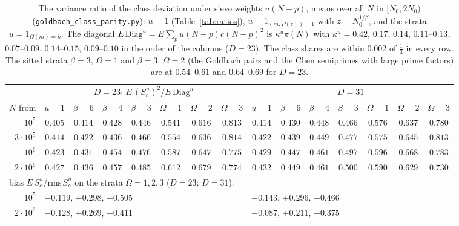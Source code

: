 \documentclass[11pt]{amsart}
\theoremstyle{remark}
\begin{document}
\begin{table}[htbp]
\centering\footnotesize\setlength{\tabcolsep}{3.2pt}
\begin{tabular}{r|ccccccc|ccccccc}
\toprule
& \multicolumn{7}{c|}{$D=23$: $E\,(S^u_c)^2/E\,\mathrm{Diag}^u$} & \multicolumn{7}{c}{$D=31$}\\
$N$ from & $u=1$ & $\beta=6$ & $\beta=4$ & $\beta=3$ & $\Omega=1$ & $\Omega=2$ & $\Omega=3$ & $u=1$ & $\beta=6$ & $\beta=4$ & $\beta=3$ & $\Omega=1$ & $\Omega=2$ & $\Omega=3$\\
\midrule
$10^5$ & $0.405$ & $0.414$ & $0.428$ & $0.446$ & $0.541$ & $0.616$ & $0.813$ & $0.414$ & $0.430$ & $0.448$ & $0.466$ & $0.576$ & $0.637$ & $0.780$\\
$3\cdot10^5$ & $0.414$ & $0.422$ & $0.436$ & $0.466$ & $0.554$ & $0.636$ & $0.814$ & $0.422$ & $0.439$ & $0.449$ & $0.477$ & $0.575$ & $0.645$ & $0.813$\\
$10^6$ & $0.423$ & $0.431$ & $0.454$ & $0.476$ & $0.587$ & $0.647$ & $0.775$ & $0.429$ & $0.447$ & $0.461$ & $0.497$ & $0.596$ & $0.668$ & $0.783$\\
$2\cdot10^6$ & $0.427$ & $0.436$ & $0.457$ & $0.485$ & $0.612$ & $0.679$ & $0.774$ & $0.432$ & $0.449$ & $0.461$ & $0.500$ & $0.590$ & $0.629$ & $0.730$\\
\midrule
\multicolumn{15}{l}{bias $E\,S^u_c/\mathrm{rms}\,S^u_c$ on the strata $\Omega=1,2,3$ ($D=23$; $D=31$):}\\
$10^5$ & \multicolumn{7}{l|}{$-0.119$, $+0.298$, $-0.505$} & \multicolumn{7}{l}{$-0.143$, $+0.296$, $-0.466$}\\
$2\cdot10^6$ & \multicolumn{7}{l|}{$-0.128$, $+0.269$, $-0.411$} & \multicolumn{7}{l}{$-0.087$, $+0.211$, $-0.375$}\\
\bottomrule
\end{tabular}
\medskip
\caption{The variance ratio of the class deviation under sieve weights $u(N-p)$, means over all $N$ in $[N_0,2N_0)$ (\texttt{goldbach\_class\_parity.py}): $u=1$ (Table~\ref{tab:ratios}), $u=1_{(m,P(z))=1}$ with $z=N_0^{1/\beta}$, and the strata $u=1_{\Omega(m)=k}$. The diagonal $E\,\mathrm{Diag}^u=E\sum_pu(N-p)c(N-p)^2$ is $\kappa^u\pi(N)$ with $\kappa^u=0.42$, $0.17$, $0.14$, $0.11$--$0.13$, $0.07$--$0.09$, $0.14$--$0.15$, $0.09$--$0.10$ in the order of the columns ($D=23$). The class shares are within $0.002$ of $\frac13$ in every row. The sifted strata $\beta=3$, $\Omega=1$ and $\beta=3$, $\Omega=2$ (the Goldbach pairs and the Chen semiprimes with large prime factors) are at $0.54$--$0.61$ and $0.64$--$0.69$ for $D=23$.}
\label{tab:strata}
\end{table}
\end{document}
